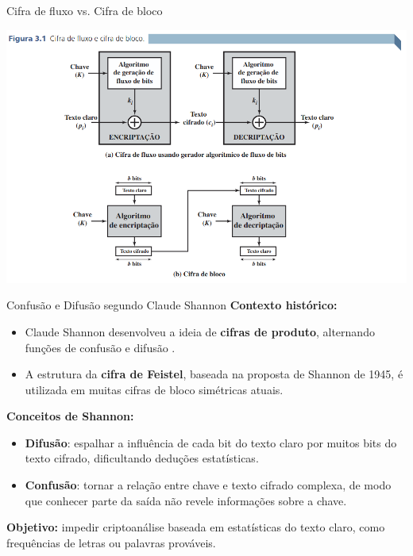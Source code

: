 \begin{frame}{Cifra de fluxo vs. Cifra de bloco}

    \centering
    \includegraphics[width=0.9\linewidth]{Figuras/cifra-de-bloco-cifra-de-fluxo.png}


\end{frame}


\begin{frame}{Confusão e Difusão segundo Claude Shannon}
    \textbf{Contexto histórico:}
    \begin{itemize}
        \item Claude Shannon desenvolveu a ideia de \textbf{cifras de produto}, alternando funções de confusão e difusão \cite{SHAN49}.
        \item A estrutura da \textbf{cifra de Feistel}, baseada na proposta de Shannon de 1945, é utilizada em muitas cifras de bloco simétricas atuais.
    \end{itemize}

    \medskip
    \textbf{Conceitos de Shannon:}
    \begin{itemize}
        \item \textbf{Difusão}: espalhar a influência de cada bit do texto claro por muitos bits do texto cifrado, dificultando deduções estatísticas.
        \item \textbf{Confusão}: tornar a relação entre chave e texto cifrado complexa, de modo que conhecer parte da saída não revele informações sobre a chave.
    \end{itemize}

    \medskip
    \textbf{Objetivo:} impedir criptoanálise baseada em estatísticas do texto claro, como frequências de letras ou palavras prováveis.
\end{frame}


